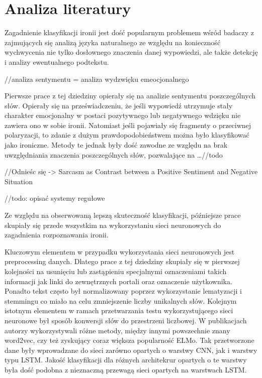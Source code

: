 \newpage %
\section{Analiza literatury}



Zagadnienie klasyfikacji ironii jest dość popularnym problemem wśród badaczy z zajmujących się analizą języka naturalnego ze względu na konieczność wychwycenia nie tylko dosłownego znaczenia danej wypowiedzi, ale także detekcję i analizy ewentualnego podtekstu.  

//analiza sentymentu = analiza wydzwięku emeocjonalnego 

Pierwsze prace z tej dziedziny opierały się na analizie sentymentu poszczególnych słów. Opierały się na przeświadczeniu, że jeśli wypowiedź utrzymuje stały charakter emocjonalny w postaci pozytywnego lub negatywnego wdzięku nie zawiera ono w sobie ironii. Natomiast jeśli pojawiały się fragmenty o przeciwnej polaryzacji, to zdanie z dużym prawdopodobieństwem można było klasyfikować jako ironiczne. Metody te jednak były dość zawodne ze względu na brak uwzględniania znaczenia poszczególnych słów, pozwalające na …//todo 

//Odnieśc się ->  Sarcasm as Contrast between a Positive Sentiment and Negative Situation 

//todo: opisać systemy regułowe 

 

Ze względu na obserwowaną lepszą skuteczność klasyfikacji, późniejsze prace skupiały się przede wszystkim na wykorzystaniu sieci neuronowych do zagadnienia rozpoznawania ironii.  

Kluczowym elementem w przypadku wykorzystania sieci neuronowych jest preprocessing danych. Dlatego prace z tej dziedziny skupiały się w pierwszej kolejności na usunięciu lub zastąpieniu specjalnymi oznaczeniami takich informacji jak linki do zewnętrznych portali oraz oznaczenie użytkownika. Ponadto tekst często był normalizowany poprzez wykorzystanie lematyzacji i stemmingu co miało na celu zmniejszenie liczby unikalnych słów. Kolejnym istotnym elementem w ramach przetwarzania testu wykorzystującego sieci neuronowe był sposób konwersji słów do przestrzeni liczbowej. W publikacjach autorzy wykorzystywali różne metody, między innymi powszechnie znany word2vec, czy też zyskujący coraz większa popularność ELMo. Tak przetworzone dane były wprowadzane do sieci zarówno opartych o warstwy CNN, jak i warstwy typu LSTM. Jakość klasyfikacji dla różnych architekrur opartych o te warstwy była dość podobna z nieznaczną przewagą sieci opartych na warstwach LSTM. 

 

